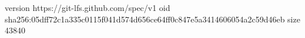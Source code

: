 version https://git-lfs.github.com/spec/v1
oid sha256:05dff72c1a335c0115f041d574d656ce64ff0c847e5a3414606054a2c59d46eb
size 43840
